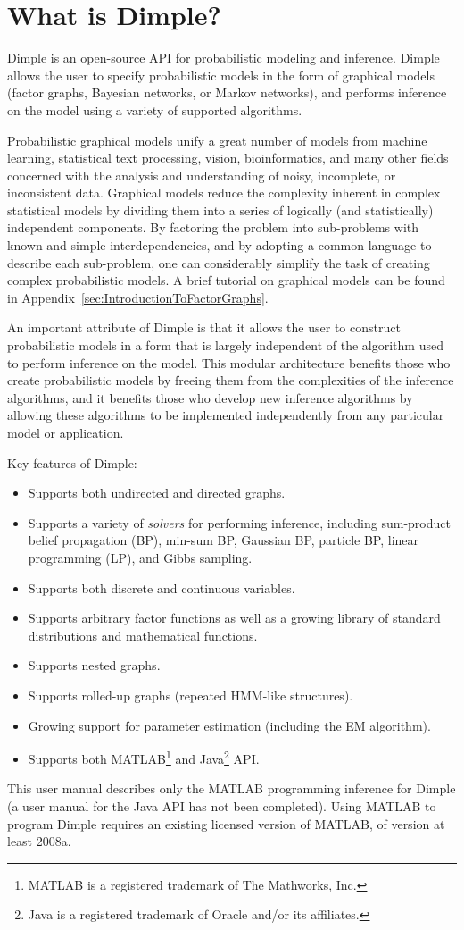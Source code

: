 \section{What is Dimple?}

Dimple is an open-source API for probabilistic modeling and inference. Dimple allows the user to specify probabilistic models in the form of graphical models (factor graphs, Bayesian networks, or Markov networks), and performs inference on the model using a variety of supported algorithms.

Probabilistic graphical models unify a great number of models from machine learning, statistical text processing, vision, bioinformatics, and many other fields concerned with the analysis and understanding of noisy, incomplete, or inconsistent data. Graphical models reduce the complexity inherent in complex statistical models by dividing them into a series of logically (and statistically) independent components. By factoring the problem into sub-problems with known and simple interdependencies, and by adopting a common language to describe each sub-problem, one can considerably simplify the task of creating complex probabilistic models.  A brief tutorial on graphical models can be found in Appendix~\ref{sec:IntroductionToFactorGraphs}.

An important attribute of Dimple is that it allows the user to construct probabilistic models in a form that is largely independent of the algorithm used to perform inference on the model. This modular architecture benefits those who create probabilistic models by freeing them from the complexities of the inference algorithms, and it benefits those who develop new inference algorithms by allowing these algorithms to be implemented independently from any particular model or application.

Key features of Dimple:
\begin{itemize}
\item Supports both undirected and directed graphs.
\item Supports a variety of \emph{solvers} for performing inference, including sum-product belief propagation (BP), min-sum BP, Gaussian BP, particle BP, linear programming (LP), and Gibbs sampling.
\item Supports both discrete and continuous variables.
\item Supports arbitrary factor functions as well as a growing library of standard distributions and mathematical functions.
\item Supports nested graphs.
\item Supports rolled-up graphs (repeated HMM-like structures).
\item Growing support for parameter estimation (including the EM algorithm).
\item Supports both MATLAB\footnote{MATLAB is a registered trademark of The Mathworks, Inc.} and Java\footnote{Java is a registered trademark of Oracle and/or its affiliates.} API.
\end{itemize}

This user manual describes only the MATLAB programming inference for Dimple (a user manual for the Java API has not been completed).  Using MATLAB to program Dimple requires an existing licensed version of MATLAB, of version at least 2008a.